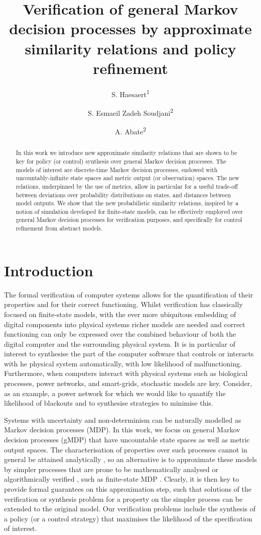 \documentclass[letterpaper, 10 pt, conference]{amsart}
\title[approximate similarity relations and policy refinement]{Verification of general Markov decision processes by approximate similarity relations and policy refinement}
\author[S. Haesaert]{S. Haesaert\textsuperscript{1}}
\author[S. Esmaeil Zadeh Soudjani ]{S. Esmaeil Zadeh Soudjani\textsuperscript{2}}
\author[A. Abate]{A. Abate\textsuperscript{2}}
\theoremstyle{definition}
\theoremstyle{example}
\theoremstyle{remark}
\begin{document}
\begin{abstract}
In this work we introduce new approximate similarity relations that are shown to be key for policy (or control) synthesis over general Markov decision processes.  
The models of interest are discrete-time Markov decision processes, 
endowed with uncountably-infinite state spaces and metric output (or observation) spaces. 
The new relations, underpinned by the use of metrics, allow in particular for a useful trade-off between   
deviations over probability distributions on states, 
and distances between model outputs.  
We show that the new probabilistic similarity relations, 
inspired by a notion of simulation developed for finite-state models,   
can be effectively employed  over general Markov decision processes for verification purposes, 
and specifically for control refinement from abstract models.    
\end{abstract}



\maketitle         
\section{Introduction}
  \setcounter{footnote}{1}
The formal verification of computer systems allows for the quantification of their properties and for their correct functioning.  
Whilst verification has classically focused on finite-state models, 
with the ever more ubiquitous embedding of digital components into physical systems  
richer models are needed and correct functioning can only be expressed over the combined behaviour of both the digital computer and the surrounding physical system.  
It is in particular of interest to synthesise the part of the computer software that controls or interacts with he physical system automatically, 
with low likelihood of malfunctioning. Furthermore, 
when computers interact with physical systems such as biological processes, power networks, and smart-grids, 
stochastic models are key. 
Consider, as an example, a power network for which we would like to quantify the likelihood of blackouts and to synthesise strategies to minimise this. 


Systems with uncertainty and non-determinism can be naturally modelled as Markov decision processes (MDP).  
In this work, we focus on general Markov decision processes (gMDP) that have uncountable state spaces as well as metric output spaces. 
The characterisation of properties over such processes cannot in general be attained analytically \cite{Abate1}, 
so an alternative is to approximate these models by simpler processes that are prone to be mathematically analysed or algorithmically verified \cite{SAID}, such as finite-state MDP \cite{FAUST13}.   
Clearly, it is then key to provide formal guarantees on this approximation step,  such that solutions of the verification or synthesis problem for a property on the simpler process can be extended to the original model. Our verification problems include the synthesis of a policy (or a control strategy) that maximises the likelihood of the specification of interest. 
\end{document}
